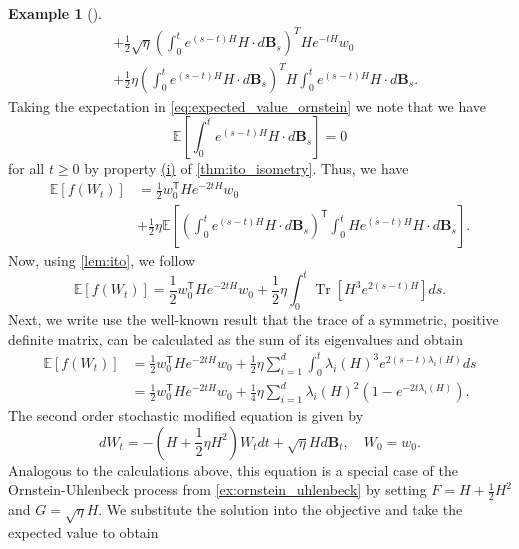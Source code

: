 \documentclass[12pt]{article}
\theoremstyle{definition}
\newtheorem{example}[example]{Example}
\numberwithin{equation}{section}
\newcommand{\T}{\mathsf{T}}
\newcommand{\ev}[1]{\mathbb{E}\left[{#1}\right]}
\DeclareMathOperator{\Tr}{Tr}
\begin{document}
\begin{example}[\autocite{liStochasticModifiedEquations2019}]
\begin{equation}
\begin{split}
    &+ \frac{1}{2} \sqrt{\eta}\left(\int_0^t e^{(s-t)H}H\cdot d\pmb{B}_s\right)^T He^{-tH}w_0 \\
    &+ \frac{1}{2} \eta \left(\int_0^t e^{(s-t)H}H\cdot d\pmb{B}_s\right)^T H\int_0^t e^{(s-t)H}H\cdot d\pmb{B}_s.
  \end{split}
\end{equation}
Taking the expectation in \eqref{eq:expected_value_ornstein} we note that we have
\begin{equation*}
  \ev{\int_0^t e^{(s-t)H}H\cdot d\pmb{B}_s} = 0
\end{equation*}
for all $t \geq 0$ by property \hyperref[item:zero_integral]{(i)} of \autoref{thm:ito_isometry}.
Thus, we have 
\begin{equation*}
  \begin{split}
  \ev{f(W_t)} &= \frac{1}{2}w_0^\T He^{-2tH}w_0 \\
  &+ \frac{1}{2} \eta \ev{ \left(\int_0^t e^{(s-t)H}H\cdot d\pmb{B}_s\right)^\T \int_0^tH e^{(s-t)H}H\cdot d\pmb{B}_s}.
  \end{split}
\end{equation*}
Now, using \autoref{lem:ito}, we follow
\begin{equation*}
  \ev{f(W_t)} = \frac{1}{2}w_0^\T He^{-2tH}w_0 + \frac{1}{2}\eta \int_0^t\Tr\left[H^3e^{2(s-t)H}\right]ds.
\end{equation*}
Next, we write use the well-known result that the trace of a symmetric, positive definite matrix, can be calculated as the sum of its eigenvalues and obtain 
\begin{equation}
  \begin{split}
    \label{eq:analytical_expected_value}
    \ev{f(W_t)} &= \frac{1}{2}w_0^\T He^{-2tH}w_0 + \frac{1}{2}\eta \sum_{i=1}^d \int_0^t\lambda_i(H)^3e^{2(s-t)\lambda_i(H)}ds \\
    & = \frac{1}{2}w_0^\T He^{-2tH}w_0 + \frac{1}{4}\eta \sum_{i=1}^d \lambda_i(H)^2\left(1 - e^{-2t\lambda_i(H)}\right).
  \end{split}
\end{equation}
The second order stochastic modified equation is given by 
\begin{equation*}
  dW_t = -(H + \frac{1}{2}\eta H^2)W_tdt + \sqrt{\eta}Hd\mathbf{B}_t, \quad W_0 = w_0.
\end{equation*}
Analogous to the calculations above, this equation is a special case of the Ornstein-Uhlenbeck process from \autoref{ex:ornstein_uhlenbeck} by setting $F = H + \frac{1}{2}H^2$ and $G = \sqrt{\eta}H$. We substitute the solution into the objective and take the expected value to obtain

\end{example}
\end{document}
